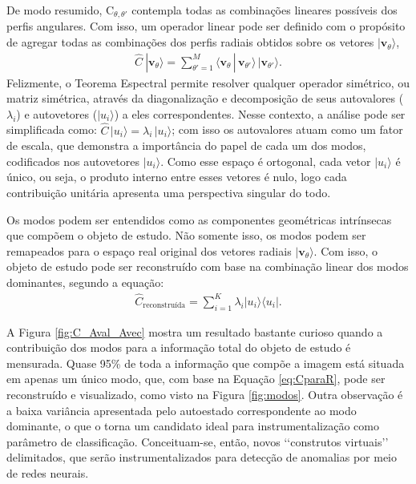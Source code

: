 \documentclass[a4paper, 12pt]{report}
\begin{document}
De modo resumido, $\text{C}_{\theta, \theta'}$ contempla todas as combinações lineares possíveis dos perfis angulares. Com isso, um operador linear pode ser definido com o propósito de agregar todas as combinações dos perfis radiais obtidos sobre os vetores $| \mathbf{v}_\theta \rangle$,
\begin{align}
	\hat{C}\ | \mathbf{v}_\theta \rangle = \sum_{\theta' = 1}^{M} \langle \mathbf{v}_\theta \,|\, \mathbf{v}_{\theta'} \rangle \, | \mathbf{v}_{\theta'} \rangle.
	\label{eq:C}
\end{align}
Felizmente, o Teorema Espectral permite resolver qualquer operador simétrico, ou matriz simétrica, através da diagonalização e decomposição de seus autovalores ($\lambda_i$) e autovetores ($|u_i\rangle$) a eles correspondentes. Nesse contexto, a análise pode ser simplificada como: $\hat{C} \, |u_i\rangle = \lambda_i \, |u_i\rangle$; com isso os autovalores atuam como um fator de escala, que demonstra a importância do papel de cada um dos modos, codificados  nos autovetores $|u_i\rangle$. Como esse espaço é ortogonal, cada vetor $|u_i\rangle$ é único, ou seja, o produto interno entre esses vetores é nulo, logo cada contribuição unitária apresenta uma perspectiva singular do todo.

Os modos podem ser entendidos como as componentes geométricas intrínsecas que compõem o objeto de estudo. Não somente isso, os modos podem ser remapeados para o espaço real original dos vetores radiais $|\mathbf{v}_\theta \rangle$. Com isso, o objeto de estudo pode ser reconstruído com base na combinação linear dos modos dominantes, segundo a equação:   
\begin{align}
	\hat{C}_{\text{reconstruída}} = \sum_{i=1}^K \lambda_i |u_i\rangle\langle u_i|.
	\label{eq:CparaR}
\end{align}

A Figura \ref{fig:C_Aval_Avec} mostra um resultado bastante curioso quando a contribuição dos modos para a informação total do objeto de estudo é mensurada. Quase 95\% de toda a informação que compõe a imagem está situada em apenas um único modo, que, com base na Equação \ref{eq:CparaR}, pode ser reconstruído e visualizado, como visto na Figura \ref{fig:modos}. Outra observação é a baixa variância apresentada pelo autoestado correspondente ao modo dominante, o que o torna um candidato ideal para instrumentalização como parâmetro de classificação. Conceituam-se, então, novos {\lq\lq}construtos virtuais{\rq\rq} delimitados, que serão instrumentalizados para detecção de anomalias por meio de redes neurais.
\end{document}
